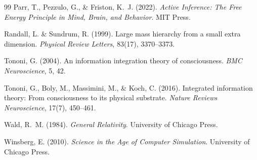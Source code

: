 \documentclass[12pt,a4paper]{article}
\begin{document}
\begin{thebibliography}{99}
Parr, T., Pezzulo, G., \& Friston, K.~J. (2022).
\newblock \emph{Active Inference: The Free Energy Principle in
  Mind, Brain, and Behavior}.
\newblock MIT Press.

Randall, L. \& Sundrum, R. (1999).
\newblock Large mass hierarchy from a small extra dimension.
\newblock \emph{Physical Review Letters}, 83(17), 3370--3373.

Tononi, G. (2004).
\newblock An information integration theory of consciousness.
\newblock \emph{BMC Neuroscience}, 5, 42.

Tononi, G., Boly, M., Massimini, M., \& Koch, C. (2016).
\newblock Integrated information theory: From consciousness to
  its physical substrate.
\newblock \emph{Nature Reviews Neuroscience}, 17(7), 450--461.

Wald, R.~M. (1984).
\newblock \emph{General Relativity}.
\newblock University of Chicago Press.

Winsberg, E. (2010).
\newblock \emph{Science in the Age of Computer Simulation}.
\newblock University of Chicago Press.

\end{thebibliography}
\end{document}
